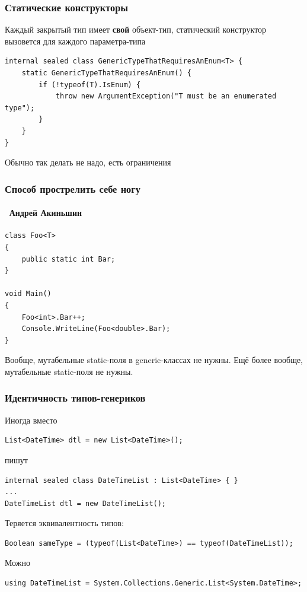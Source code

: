 \documentclass[xetex,mathserif,serif]{beamer}
\begin{document}
	\begin{frame}[fragile]
		\frametitle{Статические конструкторы}
		Каждый закрытый тип имеет \textbf{свой} объект-тип, статический конструктор вызовется для каждого параметра-типа
		\vspace{0.8cm}
		\begin{footnotesize}
			\begin{verbatim}
internal sealed class GenericTypeThatRequiresAnEnum<T> {
    static GenericTypeThatRequiresAnEnum() {
        if (!typeof(T).IsEnum) {
            throw new ArgumentException("T must be an enumerated type");
        }
    }
}
			\end{verbatim}
		\end{footnotesize}
		\vspace{0.8cm}
		Обычно так делать не надо, есть ограничения
	\end{frame}

	\begin{frame}[fragile]
		\frametitle{Способ прострелить себе ногу}
		\framesubtitle{\textcopyright\, Андрей Акиньшин}
		\begin{small}
			\begin{verbatim}
class Foo<T>
{
    public static int Bar;
}

void Main()
{
    Foo<int>.Bar++;
    Console.WriteLine(Foo<double>.Bar);
}
			\end{verbatim}
		\end{small}
		Вообще, мутабельные static-поля в generic-классах не нужны. Ещё более вообще, мутабельные static-поля не нужны.
	\end{frame}

	\begin{frame}[fragile]
		\frametitle{Идентичность типов-генериков}
		Иногда вместо
		\begin{footnotesize}
			\begin{verbatim}
List<DateTime> dtl = new List<DateTime>();
			\end{verbatim}
		\end{footnotesize}
		пишут
		\begin{footnotesize}
			\begin{verbatim}
internal sealed class DateTimeList : List<DateTime> { }
...
DateTimeList dtl = new DateTimeList();
			\end{verbatim}
		\end{footnotesize}
		\vspace{5mm}
		Теряется эквивалентность типов:
		\begin{footnotesize}
			\begin{verbatim}
Boolean sameType = (typeof(List<DateTime>) == typeof(DateTimeList));
			\end{verbatim}
		\end{footnotesize}
		\vspace{5mm}
		Можно
		\begin{footnotesize}
			\begin{verbatim}
using DateTimeList = System.Collections.Generic.List<System.DateTime>;
			\end{verbatim}
		\end{footnotesize}
	\end{frame}
\end{document}
